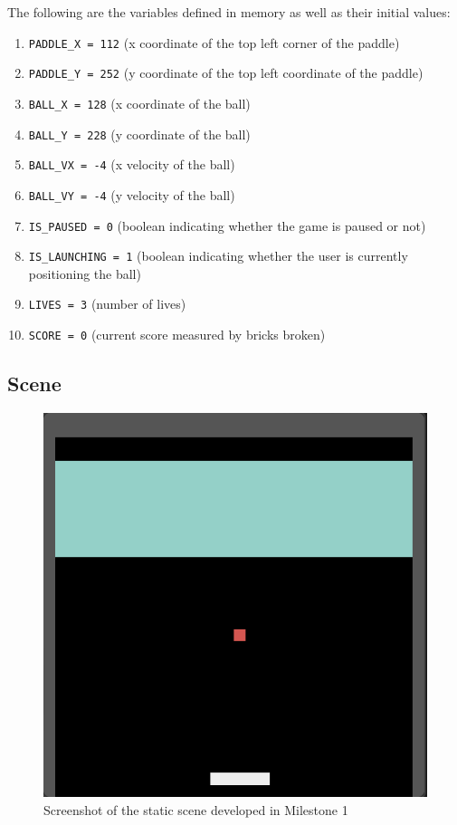 \documentclass{article}
\begin{document}
The following are the variables defined in memory as well as their initial values:
\begin{enumerate}
	\item\texttt{PADDLE\_X = 112} (x coordinate of the top left corner of the paddle)
	\item\texttt{PADDLE\_Y = 252} (y coordinate of the top left coordinate of the paddle)
	\item\texttt{BALL\_X = 128} (x coordinate of the ball)
	\item\texttt{BALL\_Y = 228} (y coordinate of the ball)
	\item\texttt{BALL\_VX = -4} (x velocity of the ball)
	\item\texttt{BALL\_VY = -4} (y velocity of the ball)
	\item\texttt{IS\_PAUSED = 0} (boolean indicating whether the game is paused or not)
	\item\texttt{IS\_LAUNCHING = 1} (boolean indicating whether the user is currently positioning the ball)
	\item\texttt{LIVES = 3} (number of lives)
\item\texttt{SCORE = 0} (current score measured by bricks broken)
\end{enumerate}


\pagebreak

\subsection*{Scene}

\begin{figure}[H]
    \centering
    \includegraphics[width=1\textwidth]{media/milestone1_static}
    \caption{Screenshot of the static scene developed in Milestone 1}
    \label{fig:fig1}
\end{figure}
\end{document}
